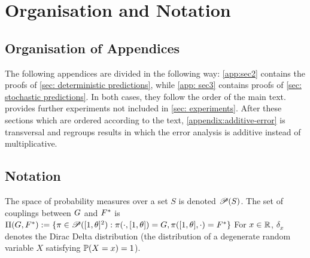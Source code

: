 \section{Organisation and Notation}\label{app:intro}

\subsection{Organisation of Appendices}\label{subapp: orga}

The following appendices are divided in the following way: \cref{app:sec2} contains the proofs of \cref{sec: deterministic predictions}, while \cref{app: sec3} contains proofs of \cref{sec: stochastic predictions}. In both cases, they follow the order of the main text.   provides further experiments not included in \cref{sec: experiments}. 
After these sections which are ordered according to the text, \cref{appendix:additive-error} is transversal and regroups results in which the error analysis is additive instead of multiplicative. 

\subsection{Notation}\label{subapp: notation}



The space of probability measures over a set $S$ is denoted $\mathscr{P}(S)$. The set of couplings between $G$ and $F^*$ is $\Pi(G,F^*):=\{\pi\in\mathscr{P}([1,\theta]^2): \pi(\cdot,[1,\theta])=G, \pi([1,\theta],\cdot)=F^*\}$
For $x\in\mathbb{R}$, $\delta_x$ denotes the Dirac Delta distribution (\ie the distribution of a degenerate random variable $X$ satisfying $\mathbb{P}(X=x)=1$). 
